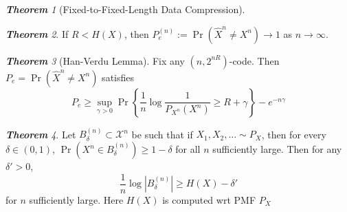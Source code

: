 \documentclass[frenchspacing,9pt,landscape,a4paper]{article}
\newcommand{\abs}[1]{\left\lvert #1 \right\rvert}
\DeclareMathOperator{\pr}{Pr}
\theoremstyle{remark}
\newtheorem*{thm}{\textbf{Theorem}}
\begin{document}
\begin{multicols}{4}
\begin{thm}[Fixed-to-Fixed-Length Data Compression]
\end{thm}
\begin{thm}
    If $R<H(X)$, then  $P_e^{(n)}:=\pr(\hat{X}^n\neq X^n)\to 1$ as  $n\to\infty$.
\end{thm}
\begin{thm}[Han-Verdu Lemma]
    Fix any $(n,2^{nR})$-code. Then  $P_e=\pr(\hat{X}^n\neq X^n)$ satisfies
    \[P_e\geq\sup_{\gamma>0}\pr\left\{\frac{1}{n}\log \frac{1}{P_{X^n}(X^n)}\geq
    R+\gamma\right\}-e^{-n\gamma}\]
\end{thm}
\begin{thm}
    Let $B_\delta^{(n)}\subset\mathcal{X}^n$ be such that if  $X_1,X_2,\dots\sim P_X$, then for every
    $\delta\in(0,1)$,  $\pr(X^n\in B_\delta^{(n)})\geq 1-\delta$ for all  $n$ sufficiently large. Then for
    any $\delta'>0$,
    \[\frac{1}{n}\log\abs{B_\delta^{(n)}}\geq H(X)-\delta'\] for $n$ sufficiently large. Here  $H(X)$ is
    computed wrt PMF  $P_X$
\end{thm}

\end{multicols}
\end{document}
